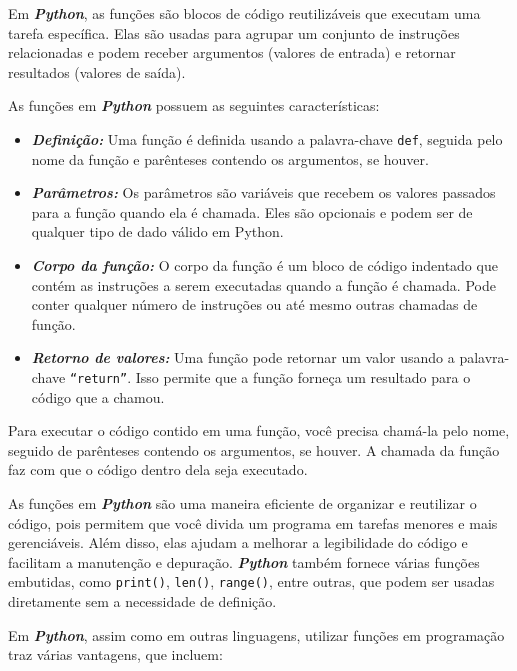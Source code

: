 \documentclass[a4paper, 12pt, onecolumn,singlespacing]{article}
\begin{document}
	Em \textbf{\textit{Python}}, as funções são blocos de código reutilizáveis que executam uma tarefa específica. Elas são usadas para agrupar um conjunto de instruções relacionadas e podem receber argumentos (valores de entrada) e retornar resultados (valores de saída).
	
	As funções em \textbf{\textit{Python}} possuem as seguintes características:
	
	\begin{itemize}
	
	\item \textbf{\textit{Definição:}} Uma função é definida usando a palavra-chave \texttt{def}, seguida pelo nome da função e parênteses contendo os argumentos, se houver.
	
	\item \textbf{\textit{Parâmetros:}} Os parâmetros são variáveis que recebem os valores passados para a função quando ela é chamada. Eles são opcionais e podem ser de qualquer tipo de dado válido em Python.
	
	\item \textbf{\textit{Corpo da função:}} O corpo da função é um bloco de código indentado que contém as instruções a serem executadas quando a função é chamada. Pode conter qualquer número de instruções ou até mesmo outras chamadas de função.
	
	\item \textbf{\textit{Retorno de valores:}} Uma função pode retornar um valor usando a palavra-chave \texttt{``return''}. Isso permite que a função forneça um resultado para o código que a chamou.
	
	\end{itemize}
	
	Para executar o código contido em uma função, você precisa chamá-la pelo nome, seguido de parênteses contendo os argumentos, se houver. A chamada da função faz com que o código dentro dela seja executado.
	
	As funções em \textbf{\textit{Python}} são uma maneira eficiente de organizar e reutilizar o código, pois permitem que você divida um programa em tarefas menores e mais gerenciáveis. Além disso, elas ajudam a melhorar a legibilidade do código e facilitam a manutenção e depuração. \textbf{\textit{Python}} também fornece várias funções embutidas, como \texttt{print()}, \texttt{len()}, \texttt{range()}, entre outras, que podem ser usadas diretamente sem a necessidade de definição.
	
	Em \textbf{\textit{Python}}, assim como em outras linguagens, utilizar funções em programação traz várias vantagens, que incluem:
	
\end{document}

